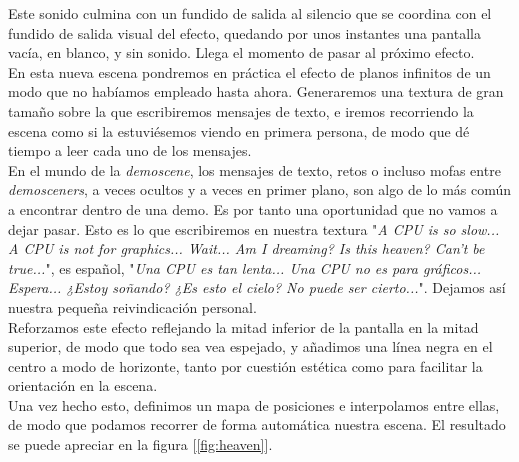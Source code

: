 Este sonido culmina con un fundido de salida al silencio que se coordina con el fundido de salida visual del efecto, quedando por unos instantes una pantalla vacía, en blanco, y sin sonido. Llega el momento de pasar al próximo efecto.\\

En esta nueva escena pondremos en práctica el efecto de planos infinitos de un modo que no habíamos empleado hasta ahora. Generaremos una textura de gran tamaño sobre la que escribiremos mensajes de texto, e iremos recorriendo la escena como si la estuviésemos viendo en primera persona, de modo que dé tiempo a leer cada uno de los mensajes.\\

En el mundo de la \emph{demoscene}, los mensajes de texto, retos o incluso mofas entre \emph{demosceners}, a veces ocultos y a veces en primer plano, son algo de lo más común a encontrar dentro de una demo. Es por tanto una oportunidad que no vamos a dejar pasar. Esto es lo que escribiremos en nuestra textura "\emph{A CPU is so slow... A CPU is not for graphics... Wait... Am I dreaming? Is this heaven? Can't be true...}", es español, "\emph{Una CPU es tan lenta... Una CPU no es para gráficos... Espera... ¿Estoy soñando? ¿Es esto el cielo? No puede ser cierto...}". Dejamos así nuestra pequeña reivindicación personal.\\

Reforzamos este efecto reflejando la mitad inferior de la pantalla en la mitad superior, de modo que todo sea vea espejado, y añadimos una línea negra en el centro a modo de horizonte, tanto por cuestión estética como para facilitar la orientación en la escena.\\

Una vez hecho esto, definimos un mapa de posiciones e interpolamos entre ellas, de modo que podamos recorrer de forma automática nuestra escena. El resultado se puede apreciar en la figura [\ref{fig:heaven}].\\

